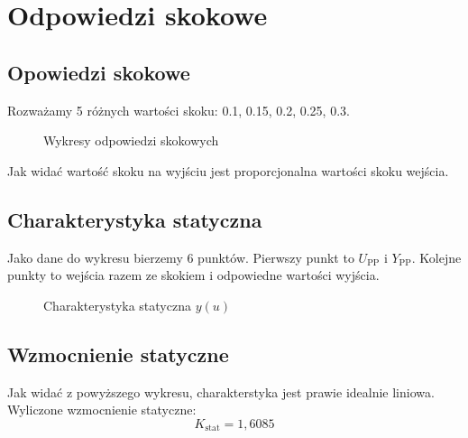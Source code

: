 \chapter{Odpowiedzi skokowe}

\section{Opowiedzi skokowe}
Rozważamy 5 różnych wartości skoku: \num{0,1}, \num{0,15}, \num{0,2}, \num{0,25}, \num{0,3}.

\begin{figure}[H]
\centering

\caption{Wykresy odpowiedzi skokowych}
\end{figure}

Jak widać wartość skoku na wyjściu jest proporcjonalna wartości skoku wejścia.

\section{Charakterystyka statyczna}
Jako dane do wykresu bierzemy 6 punktów. Pierwszy punkt to $U_{\mathrm{PP}}$ i $Y_{\mathrm{PP}}$. Kolejne punkty to wejścia razem ze skokiem i odpowiedne wartości wyjścia.

\begin{figure}[H]
\centering

\caption{Charakterystyka statyczna $y(u)$}
\end{figure}

\section{Wzmocnienie statyczne}
Jak widać z powyższego wykresu, charakterstyka jest prawie idealnie liniowa. Wyliczone wzmocnienie statyczne:
\begin{equation}
K_{\mathrm{stat}} = 1,6085
\end{equation}
